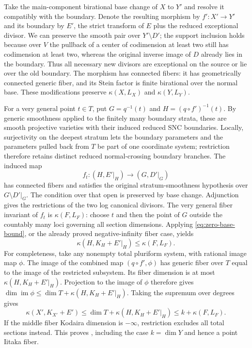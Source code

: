Take the main-component birational base change of $X$ to $Y'$ and resolve
it compatibly with the boundary. Denote the resulting morphism by
$f'\colon X'\to Y'$ and its boundary by $E'$, the strict transform of $E$
plus the reduced exceptional divisor. We can preserve the smooth pair
over $Y'\setminus D'$; the support inclusion holds because over $V$ the
pullback of a center of codimension at least two still has codimension at
least two, whereas the original inverse image of $D$ already lies in the
boundary. Thus all necessary new divisors are exceptional on the source
or lie over the old boundary. The morphism has connected fibers: it has
geometrically connected generic fiber, and its Stein factor is finite
birational over the normal base. These modifications preserve
$\kappa(X,L_X)$ and $\kappa(Y,L_Y)$.

For a very general point $t\in T$, put $G=q^{-1}(t)$ and
$H=(q\circ f')^{-1}(t)$. By generic smoothness applied to the finitely
many boundary strata, these are smooth projective varieties with their
induced reduced SNC boundaries.  Locally, surjectivity on the deepest
stratum lets the boundary parameters and the parameters pulled back from
$T$ be part of one coordinate system; restriction therefore retains
distinct reduced normal-crossing boundary branches.  The induced map
\[
 f_t\colon (H,E'|_H)\longrightarrow(G,D'|_G)
\]
has connected fibers and satisfies the original stratum-smoothness
hypothesis over $G\setminus D'|_G$. The condition over that open is
preserved by base change. Adjunction gives the restrictions of the two
log canonical divisors. The very general fiber invariant of $f_t$ is
$\kappa(F,L_F)$: choose $t$ and then the point of $G$ outside the
countably many loci governing all section dimensions. Applying
\eqref{eq:zero-base-bound}, or the already proved negative-infinity fiber
case, yields
\[
 \kappa(H,K_H+E'|_H)\leq\kappa(F,L_F).
\]
For completeness, take any nonempty total pluriform system, with
rational image map $\phi$. The image of the combined map
$(q\circ f',\phi)$ has generic fiber over $T$ equal to the image of the
restricted subsystem. Its fiber dimension is at most
$\kappa(H,K_H+E'|_H)$. Projection to the image of $\phi$ therefore gives
$\dim\operatorname{im}\phi\leq\dim T+\kappa(H,K_H+E'|_H)$.
Taking the supremum over degrees gives
\[
 \kappa(X',K_{X'}+E')
 \leq \dim T+\kappa(H,K_H+E'|_H)
 \leq k+\kappa(F,L_F).
\]
If the middle fiber Kodaira dimension is $-\infty$, restriction excludes
all total sections instead. This proves , including
the case $k=\dim Y$ and hence a point Iitaka fiber.
